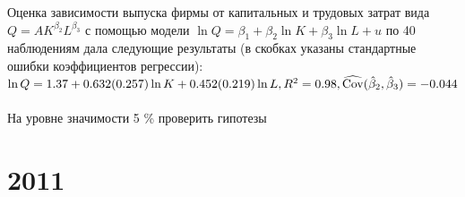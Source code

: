 \documentclass[addpoints, answers]{exam} %
\begin{document}
\begin{questions}
\question  Оценка зависимости выпуска фирмы от капитальных и трудовых затрат вида $Q=AK^{\beta_2}L^{\beta_3}$ с помощью модели $\ln Q=\beta_1+\beta_2\ln K+\beta_3\ln L+u$ по 40 наблюдениям дала следующие результаты (в скобках указаны стандартные ошибки коэффициентов регрессии):\\
$\ln Q=1.37+0.632 (0.257)\ln K+0.452(0.219)\ln L, R^2=0.98, \widehat{\operatorname{Cov}}(\hat{\beta}_2,\hat{\beta}_3)=-0.044$\\
\\На уровне значимости 5 \% проверить гипотезы

\end{questions}

\section{2011}
\end{document}
